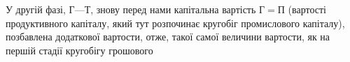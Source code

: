 У другій фазі, $Г — Т$, знову перед нами капітальна вартість
$Г = П$ (вартості продуктивного капіталу, який тут розпочинає кругобіг
промислового капіталу), позбавлена додаткової вартости, отже, такої
самої величини вартости, як на першій стадії кругобігу грошового
\parbreak{}  %
